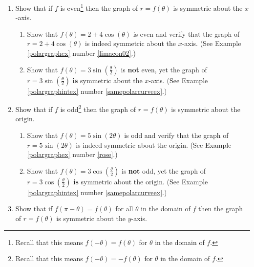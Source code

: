 \begin{enumerate}

\setcounter{enumi}{\value{HW}}

\item Show that if $f$ is even\footnote{Recall that this means $f(-\theta) = f(\theta)$ for $\theta$ in the domain of $f$.} then the graph of $r = f(\theta)$ is symmetric about the $x$-axis. \label{sympolarfirst}

\begin{enumerate}

\item Show that $f(\theta) = 2 + 4\cos(\theta)$ is even and verify that the graph of  $r = 2+4\cos(\theta)$ is indeed symmetric about the $x$-axis.  (See Example \ref{polargraphex} number \ref{limacon02}.)

\item Show that $f(\theta) = 3\sin\left(\frac{\theta}{2}\right)$ is \textbf{not} even, yet the graph of $r = 3\sin\left(\frac{\theta}{2}\right)$ \textbf{is} symmetric about the $x$-axis.  (See  Example \ref{polargraphintex} number \ref{samepolarcurveex}.) 

\end{enumerate}

\item  Show that if $f$ is odd\footnote{Recall that this means $f(-\theta) = -f(\theta)$ for $\theta$ in the domain of $f$.} then the graph of $r = f(\theta)$ is symmetric about the origin.

\begin{enumerate}

\item  Show that $f(\theta) = 5\sin(2\theta)$ is odd and verify that the graph of $r = 5\sin(2\theta)$ is indeed symmetric about the origin.  (See Example \ref{polargraphex} number \ref{rose}.)

\item  Show that $f(\theta) = 3\cos\left(\frac{\theta}{2}\right)$ is \textbf{not} odd, yet the graph of $r = 3\cos\left(\frac{\theta}{2}\right)$ \textbf{is} symmetric about the origin.  (See  Example \ref{polargraphintex} number \ref{samepolarcurveex}.)

\end{enumerate}

\item  Show that if $ f(\pi-\theta)=f(\theta)$ for all $\theta$ in the domain of $f$ then the graph of $r = f(\theta)$ is symmetric about the $y$-axis. \label{sympolarlast}


\end{enumerate}
